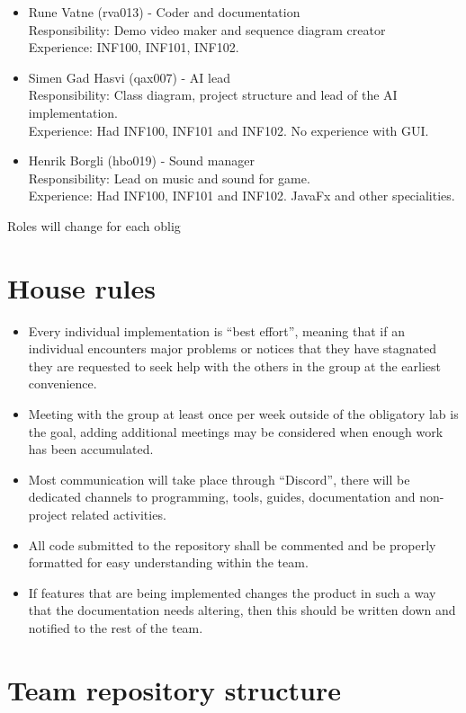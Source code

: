 \documentclass[12pt]{article}%
\begin{document}
\begin{itemize}
\item Rune Vatne  (rva013) - Coder and documentation\\
Responsibility:  Demo video maker and sequence diagram creator \\
	Experience: INF100, INF101, INF102.
\item Simen Gad Hasvi  (qax007) - AI lead\\
Responsibility: Class diagram, project structure and lead of the AI implementation.\\
	Experience: Had INF100, INF101 and INF102. No experience with GUI.
  \item Henrik Borgli (hbo019) - Sound manager\\
  Responsibility: Lead on music and sound for game.\\
  	Experience: Had INF100, INF101 and INF102. JavaFx and other specialities.
\end{itemize}

Roles will change for each oblig


\section{House rules}


\begin{itemize}
\item Every individual implementation is “best effort”, meaning that if an individual encounters major problems or notices that they have stagnated they are requested to seek help with the others in the group at the earliest convenience.
\item Meeting with the group at least once per week outside of the obligatory lab is the goal, adding additional meetings may be considered when enough work has been accumulated.
\item Most communication will take place through “Discord”, there will be dedicated channels to programming, tools, guides, documentation and non-project related activities.
\item All code submitted to the repository shall be commented and be properly formatted for easy understanding within the team.
\item If features that are being implemented changes the product in such a way that the documentation needs altering, then this should be written down and notified to the rest of the team.
\end{itemize}


\section{Team repository structure}
\end{document}
